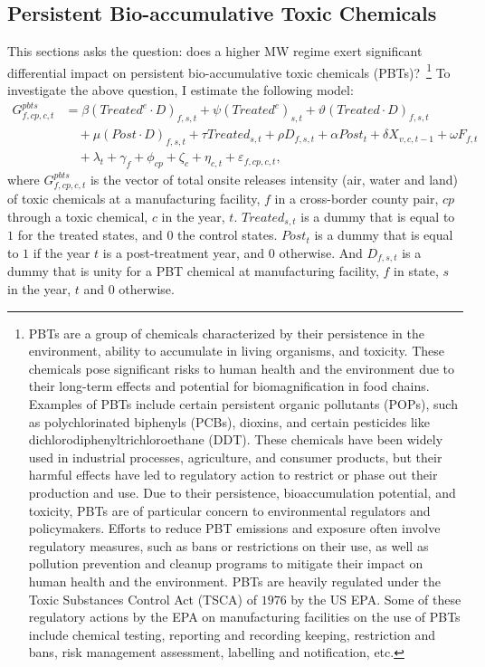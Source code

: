\documentclass[12pt, english]{article}
\begin{document}
    \subsection{Persistent Bio-accumulative Toxic Chemicals}\label{subsec:persistent-bioaccumulative-toxic-chemicals}
    This sections asks the question: does a higher MW regime exert significant differential impact on persistent bio-accumulative toxic chemicals (PBTs)?~\footnote{\tiny PBTs are a group of chemicals characterized by their persistence in the environment, ability to accumulate in living organisms, and toxicity. These chemicals pose significant risks to human health and the environment due to their long-term effects and potential for biomagnification in food chains. Examples of PBTs include certain persistent organic pollutants (POPs), such as polychlorinated biphenyls (PCBs), dioxins, and certain pesticides like dichlorodiphenyltrichloroethane (DDT). These chemicals have been widely used in industrial processes, agriculture, and consumer products, but their harmful effects have led to regulatory action to restrict or phase out their production and use. Due to their persistence, bioaccumulation potential, and toxicity, PBTs are of particular concern to environmental regulators and policymakers. Efforts to reduce PBT emissions and exposure often involve regulatory measures, such as bans or restrictions on their use, as well as pollution prevention and cleanup programs to mitigate their impact on human health and the environment. PBTs are heavily regulated under the Toxic Substances Control Act (TSCA) of $1976$ by the US EPA. Some of these regulatory actions by the EPA on manufacturing facilities on the use of PBTs include chemical testing, reporting and recording keeping, restriction and bans, risk management assessment, labelling and notification, etc.} To investigate the above question, I estimate the following model:
    \begin{align}
        G_{f,cp,c,t}^{pbts} &= \beta (Treated^{e} \cdot D)_{f,s,t} + \psi (Treated^{e})_{s,t} + \vartheta (Treated \cdot D)_{f,s,t} \nonumber \\
        &\quad + \mu (Post \cdot D)_{f,s,t} + \tau Treated_{s,t} + \rho D_{f,s,t} + \alpha Post_{t} + \delta X_{v,c,t-1} + \omega F_{f,t} \nonumber \\
        &\quad + \lambda_{t} + \gamma_{f} + \phi_{cp} + \zeta_{c} + \eta_{c,t} + \varepsilon_{f,cp,c,t},\label{eq:heterogeneous-onsite-releases-intensity-pbts}
    \end{align}
    where $G_{f,cp,c,t}^{pbts}$ is the vector of total onsite releases intensity (air, water and land) of toxic chemicals at a manufacturing facility, $f$ in a cross-border county pair, $cp$ through a toxic chemical, $c$ in the year, $t$. $Treated_{s,t}$ is a dummy that is equal to $1$ for the treated states, and $0$ the control states. $Post_{t}$ is a dummy that is equal to $1$ if the year $t$ is a post-treatment year, and $0$ otherwise. And $D_{f,s,t}$ is a dummy that is unity for a PBT chemical at manufacturing facility, $f$ in state, $s$ in the year, $t$ and $0$ otherwise.
    
\end{document}
